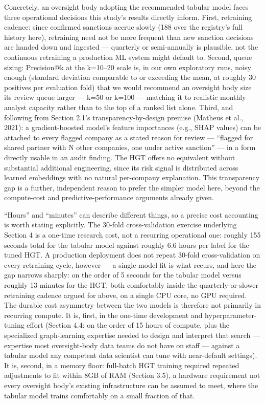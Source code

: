 \documentclass[11pt,]{article}
\begin{document}
Concretely, an oversight body adopting the recommended tabular model
faces three operational decisions this study's results directly inform.
First, retraining cadence: since confirmed sanctions accrue slowly (188
over the registry's full history here), retraining need not be more
frequent than new sanction decisions are handed down and ingested ---
quarterly or semi-annually is plausible, not the continuous retraining a
production ML system might default to. Second, queue sizing: Precision@k
at the k=10--20 scale is, in our own exploratory runs, noisy enough
(standard deviation comparable to or exceeding the mean, at roughly 30
positives per evaluation fold) that we would recommend an oversight body
size its review queue larger --- k=50 or k=100 --- matching it to
realistic monthly analyst capacity rather than to the top of a ranked
list alone. Third, and following from Section 2.1's
transparency-by-design premise (Matheus et al., 2021): a
gradient-boosted model's feature importances (e.g., SHAP values) can be
attached to every flagged company as a stated reason for review ---
``flagged for shared partner with N other companies, one under active
sanction'' --- in a form directly usable in an audit finding. The HGT
offers no equivalent without substantial additional engineering, since
its risk signal is distributed across learned embeddings with no natural
per-company explanation. This transparency gap is a further, independent
reason to prefer the simpler model here, beyond the compute-cost and
predictive-performance arguments already given.

``Hours'' and ``minutes'' can describe different things, so a precise
cost accounting is worth stating explicitly. The 30-fold
cross-validation exercise underlying Section 4 is a one-time research
cost, not a recurring operational one: roughly 155 seconds total for the
tabular model against roughly 6.6 hours per label for the tuned HGT. A
production deployment does not repeat 30-fold cross-validation on every
retraining cycle, however --- a single model fit is what recurs, and
here the gap narrows sharply: on the order of 5 seconds for the tabular
model versus roughly 13 minutes for the HGT, both comfortably inside the
quarterly-or-slower retraining cadence argued for above, on a single CPU
core, no GPU required. The durable cost asymmetry between the two models
is therefore not primarily in recurring compute. It is, first, in the
one-time development and hyperparameter-tuning effort (Section 4.4: on
the order of 15 hours of compute, plus the specialized graph-learning
expertise needed to design and interpret that search --- expertise most
oversight-body data teams do not have on staff --- against a tabular
model any competent data scientist can tune with near-default settings).
It is, second, in a memory floor: full-batch HGT training required
repeated adjustments to fit within 8GB of RAM (Section 3.5), a hardware
requirement not every oversight body's existing infrastructure can be
assumed to meet, where the tabular model trains comfortably on a small
fraction of that.
\end{document}
